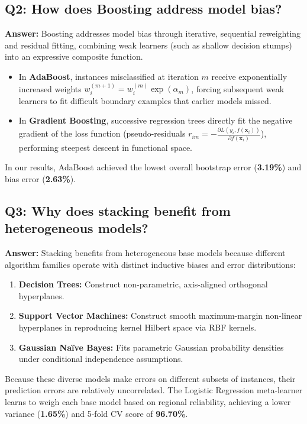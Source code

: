 \documentclass[12pt,a4paper]{article}
\begin{document}
\subsection*{Q2: How does Boosting address model bias?}
\textbf{Answer:}
Boosting addresses model bias through iterative, sequential reweighting and residual fitting, combining weak learners (such as shallow decision stumps) into an expressive composite function.
\begin{itemize}
    \item In \textbf{AdaBoost}, instances misclassified at iteration $m$ receive exponentially increased weights $w_i^{(m+1)} = w_i^{(m)} \exp(\alpha_m)$, forcing subsequent weak learners to fit difficult boundary examples that earlier models missed.
    \item In \textbf{Gradient Boosting}, successive regression trees directly fit the negative gradient of the loss function (pseudo-residuals $r_{im} = -\frac{\partial L(y_i, f(\mathbf{x}_i))}{\partial f(\mathbf{x}_i)}$), performing steepest descent in functional space.
\end{itemize}
In our results, AdaBoost achieved the lowest overall bootstrap error (\textbf{3.19\%}) and bias error (\textbf{2.63\%}).

\subsection*{Q3: Why does stacking benefit from heterogeneous models?}
\textbf{Answer:}
Stacking benefits from heterogeneous base models because different algorithm families operate with distinct inductive biases and error distributions:
\begin{enumerate}
    \item \textbf{Decision Trees:} Construct non-parametric, axis-aligned orthogonal hyperplanes.
    \item \textbf{Support Vector Machines:} Construct smooth maximum-margin non-linear hyperplanes in reproducing kernel Hilbert space via RBF kernels.
    \item \textbf{Gaussian Na\"ive Bayes:} Fits parametric Gaussian probability densities under conditional independence assumptions.
\end{enumerate}
Because these diverse models make errors on different subsets of instances, their prediction errors are relatively uncorrelated. The Logistic Regression meta-learner learns to weigh each base model based on regional reliability, achieving a lower variance (\textbf{1.65\%}) and 5-fold CV score of \textbf{96.70\%}.
\end{document}
